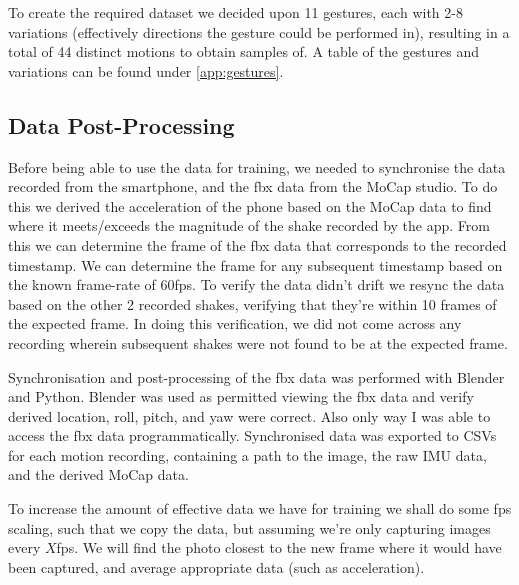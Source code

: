 To create the required dataset we decided upon 11 gestures, each with 2-8 variations (effectively directions the gesture could be performed in), resulting in a total of 44 distinct motions to obtain samples of. A table of the gestures and variations can be found under \autoref{app:gestures}.



\subsection{Data Post-Processing}
Before being able to use the data for training, we needed to synchronise the data recorded from the smartphone, and the fbx data from the MoCap studio.
To do this we derived the acceleration of the phone based on the MoCap data to find where it meets/exceeds the magnitude of the shake recorded by the app. From this we can determine the frame of the fbx data that corresponds to the recorded timestamp. We can determine the frame for any subsequent timestamp based on the known frame-rate of 60fps. 
To verify the data didn't drift we resync the data based on the other 2 recorded shakes, verifying that they're within 10 frames of the expected frame. In doing this verification, we did not come across any recording wherein subsequent shakes were not found to be at the expected frame.

Synchronisation and post-processing of the fbx data was performed with Blender and Python.
Blender was used as permitted viewing the fbx data and verify derived location, roll, pitch, and yaw were correct. Also only way I was able to access the fbx data programmatically.
Synchronised data was exported to CSVs for each motion recording, containing a path to the image, the raw IMU data, and the derived MoCap data.



To increase the amount of effective data we have for training we shall do some fps scaling, such that we copy the data, but assuming we're only capturing images every $X$fps. We will find the photo closest to the new frame where it would have been captured, and average appropriate data (such as acceleration).

